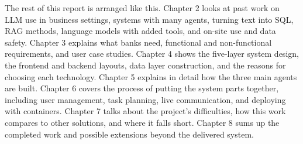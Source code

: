 The rest of this report is arranged like this. Chapter 2 looks at past work on LLM use in business settings, systems with many agents, turning text into SQL, RAG methods, language models with added tools, and on-site use and data safety. Chapter 3 explains what banks need, functional and non-functional requirements, and user case studies. Chapter 4 shows the five-layer system design, the frontend and backend layouts, data layer construction, and the reasons for choosing each technology. Chapter 5 explains in detail how the three main agents are built. Chapter 6 covers the process of putting the system parts together, including user management, task planning, live communication, and deploying with containers. Chapter 7 talks about the project's difficulties, how this work compares to other solutions, and where it falls short. Chapter 8 sums up the completed work and possible extensions beyond the delivered system.

\newpage

